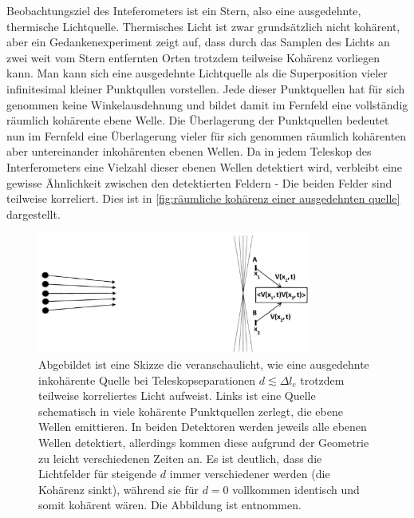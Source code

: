 Beobachtungsziel des Inteferometers ist ein Stern, also eine ausgedehnte, thermische Lichtquelle. 
Thermisches Licht ist zwar grundsätzlich nicht kohärent, aber ein Gedankenexperiment zeigt auf, dass durch das Samplen des Lichts an zwei weit vom Stern entfernten Orten trotzdem teilweise Kohärenz vorliegen kann. 
Man kann sich eine ausgedehnte Lichtquelle als die Superposition vieler infinitesimal kleiner Punktqullen vorstellen. 
Jede dieser Punktquellen hat für sich genommen keine Winkelausdehnung und bildet damit im Fernfeld eine vollständig räumlich kohärente ebene Welle. 
Die Überlagerung der Punktquellen bedeutet nun im Fernfeld eine Überlagerung vieler für sich genommen räumlich kohärenten aber untereinander inkohärenten ebenen Wellen. 
Da in jedem Teleskop des Interferometers eine Vielzahl dieser ebenen Wellen detektiert wird, verbleibt eine gewisse Ähnlichkeit zwischen den detektierten Feldern - Die beiden Felder sind teilweise korreliert. 
Dies ist in \autoref{fig:räumliche kohärenz einer ausgedehnten quelle} dargestellt. 
\begin{figure}[htbp]
    \centering
    \includegraphics[width=0.8\textwidth]{images/Theorie/Burke_9.25.png}
    \caption{Abgebildet ist eine Skizze die veranschaulicht, wie eine ausgedehnte inkohärente Quelle bei Teleskopseparationen $d\lesssim\Delta l_c$ trotzdem teilweise korreliertes Licht aufweist. Links ist eine Quelle schematisch in viele kohärente Punktquellen zerlegt, die ebene Wellen emittieren. In beiden Detektoren werden jeweils alle ebenen Wellen detektiert, allerdings kommen diese aufgrund der Geometrie zu leicht verschiedenen Zeiten an. Es ist deutlich, dass die Lichtfelder für steigende $d$ immer verschiedener werden (die Kohärenz sinkt), während sie für $d=0$ vollkommen identisch und somit kohärent wären. Die Abbildung ist \cite[Fig. 9.25]{burkeIntroductionRadioAstronomy2019} entnommen.}
    \label{fig:räumliche kohärenz einer ausgedehnten quelle}
\end{figure}
